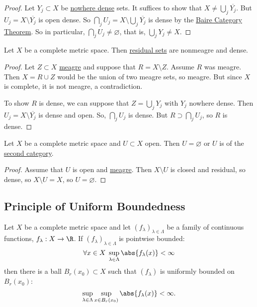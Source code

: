 \documentclass{article}
\renewcommand{\emptyset}{\varnothing}
\begin{document}
\begin{proof}
    Let $Y_j \subset X$ be \hyperlink{def:meagre}{nowhere dense} sets. It suffices to show that $X \neq \bigcup_j \overline{Y_j}$.
    But $U_j = X \setminus \overline{Y_j}$ is open dense.
    So $\bigcap_j U_j = X \setminus \bigcup_j \overline{Y_j}$ is dense by the \hyperlink{thm:baireCategory}{Baire Category Theorem}.
    So in particular, $\bigcap_j U_j \neq \emptyset$, that is, $\bigcup_j Y_j \neq X$.
\end{proof}

\begin{cor}
    Let $X$ be a complete metric space. Then \hyperlink{def:meagre}{residual sets} are nonmeagre and dense.
\end{cor}

\begin{proof}
    Let $Z \subset X$ \hyperlink{def:meagre}{meagre} and suppose that $R = X \setminus Z$. Assume $R$ was meagre.
    Then $X = R \cup Z$ would be the union of two meagre sets, so meagre.
    But since $X$ is complete, it is not meagre, a contradiction.

    To show $R$ is dense, we can suppose that $Z = \bigcup_j Y_j$ with $Y_j$ nowhere dense.
    Then $U_j = X \setminus \overline{Y_j}$ is dense and open.
    So, $\bigcap_j U_j$ is dense.
    But $R \supset \bigcap_j U_j$, so $R$ is dense.
\end{proof}


\begin{cor}
    Let $X$ be a complete metric space and $U \subset X$ open. Then $U = \emptyset$ or $U$ is of the \hyperlink{def:meagre}{second category}.
\end{cor}

\begin{proof}
    Assume that $U$ is open and \hyperlink{def:meagre}{meagre}.  Then $X \setminus U$ is closed and residual, so dense, so $X \setminus U = X$, so $U = \emptyset$.
\end{proof}

\subsection{Principle of Uniform Boundedness}

\begin{thm}
    Let $X$ be a complete metric space and let $(f_\lambda)_{\lambda \in \Lambda}$ be a family of continuous functions, $f_\lambda:X \to \R$.
    If $(f_\lambda)_{\lambda \in \Lambda}$ is pointwise bounded:
    \begin{equation*}
        \forall x \in X \; \sup_{\lambda \in \Lambda} \abs{f_\lambda(x)} < \infty
    \end{equation*}
    then there is a ball $B_r(x_0) \subset X$ such that $(f_\lambda)$ is uniformly bounded on $B_r(x_0)$:
    \begin{equation*}
        \sup_{\lambda \in \Lambda} \sup_{x \in B_r(x_0)} \abs{f_\lambda(x)} < \infty.
    \end{equation*}
\end{thm}
\end{document}
